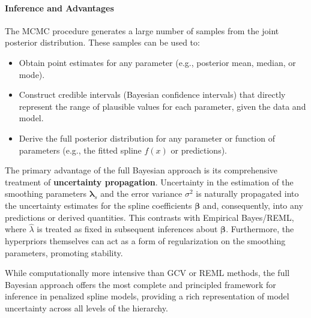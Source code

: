 \documentclass[11pt, a4paper]{article}
\begin{document}
\begin{itemize}
\paragraph{Inference and Advantages}
The MCMC procedure generates a large number of samples from the joint posterior distribution. These samples can be used to:
\begin{itemize}
 \item Obtain point estimates for any parameter (e.g., posterior mean, median, or mode).
 \item Construct credible intervals (Bayesian confidence intervals) that directly represent the range of plausible values for each parameter, given the data and model.
 \item Derive the full posterior distribution for any parameter or function of parameters (e.g., the fitted spline $f(x)$ or predictions).
\end{itemize}
The primary advantage of the full Bayesian approach is its comprehensive treatment of \textbf{uncertainty propagation}. Uncertainty in the estimation of the smoothing parameters $\boldsymbol{\lambda}_s$ and the error variance $\sigma^2$ is naturally propagated into the uncertainty estimates for the spline coefficients $\boldsymbol{\beta}$ and, consequently, into any predictions or derived quantities. This contrasts with Empirical Bayes/REML, where $\hat{\lambda}$ is treated as fixed in subsequent inferences about $\boldsymbol{\beta}$. Furthermore, the hyperpriors themselves can act as a form of regularization on the smoothing parameters, promoting stability.

While computationally more intensive than GCV or REML methods, the full Bayesian approach offers the most complete and principled framework for inference in penalized spline models, providing a rich representation of model uncertainty across all levels of the hierarchy.


\end{itemize}
\end{document}
